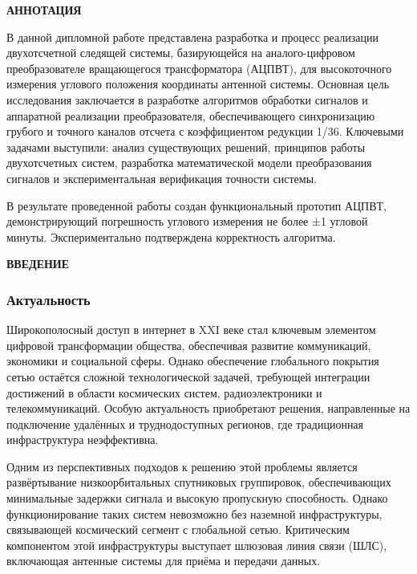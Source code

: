 \newpage
\begin{center}
  \textbf{\large АННОТАЦИЯ}
\end{center}

В данной дипломной работе представлена разработка и процесс реализации двухотсчетной следящей системы, 
базирующейся на аналого-цифровом преобразователе вращающегося трансформатора (АЦПВТ), 
для высокоточного измерения углового положения координаты антенной системы. 
Основная цель исследования заключается в разработке алгоритмов обработки сигналов и аппаратной реализации преобразователя, 
обеспечивающего синхронизацию грубого и точного каналов отсчета с коэффициентом редукции 1/36. 
Ключевыми задачами выступили: анализ существующих решений, принципов работы двухотсчетных систем, разработка математической модели преобразования сигналов и
экспериментальная верификация точности системы.

В результате проведенной работы создан функциональный прототип АЦПВТ, демонстрирующий погрешность углового измерения не более ±1 угловой минуты.
Экспериментально подтверждена корректность алгоритма.


\onehalfspacing
\setcounter{page}{2}

\newpage
\renewcommand{\contentsname}{\centerline{\large СОДЕРЖАНИЕ}}
\tableofcontents

\newpage
\begin{center}
  \textbf{\large ВВЕДЕНИЕ}
\end{center}


\subsubsection{Актуальность} 

Широкополосный доступ в интернет в XXI веке стал ключевым элементом цифровой трансформации общества, 
обеспечивая развитие коммуникаций, экономики и социальной сферы. Однако обеспечение глобального покрытия сетью 
остаётся сложной технологической задачей, требующей интеграции достижений в области космических систем, радиоэлектроники 
и телекоммуникаций. Особую актуальность приобретают решения, направленные на подключение удалённых и труднодоступных регионов, 
где традиционная инфраструктура неэффективна.

Одним из перспективных подходов к решению этой проблемы является развёртывание низкоорбитальных спутниковых группировок, 
обеспечивающих минимальные задержки сигнала и высокую пропускную способность. Однако функционирование таких систем невозможно без наземной инфраструктуры, 
связывающей космический сегмент с глобальной сетью. Критическим компонентом этой инфраструктуры выступает шлюзовая линия связи (ШЛС), 
включающая антенные системы для приёма и передачи данных.

